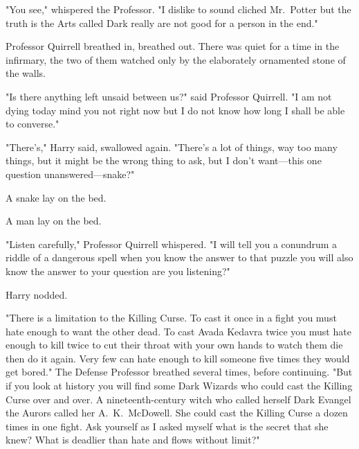 "You see," whispered the Professor. "I dislike to sound cliched{\el}
Mr.~Potter{\el} but the truth is{\el} the Arts called Dark{\el} really
are not good for a person{\el} in the end."

Professor Quirrell breathed in, breathed out. There was quiet for a time in the
infirmary, the two of them watched only by the elaborately ornamented stone of
the walls.

"Is there anything left{\el} unsaid between us?" said Professor Quirrell. "I
am not dying today{\el} mind you{\el} not right now{\el} but I do not
know how long{\el} I shall be able to converse."

"There's," Harry said, swallowed again. "There's a lot of things, way too many
things, but{\el} it might be the wrong thing to ask, but I don't want---this
one question unanswered---snake?"

A snake lay on the bed.


A man lay on the bed.

"Listen carefully," Professor Quirrell whispered. "I will tell you a
conundrum{\el} a riddle of a dangerous spell{\el} when you know the
answer to that puzzle{\el} you will also know{\el} the answer to your
question{\el} are you listening?"

Harry nodded.

"There is a limitation{\el} to the Killing Curse. To cast it once{\el} in
a fight{\el} you must hate enough{\el} to want the other dead. To cast
Avada{\el} Kedavra twice{\el} you must hate enough{\el} to kill
twice{\el} to cut their throat with your own hands{\el} to watch them
die{\el} then do it again. Very few{\el} can hate enough{\el} to kill
someone{\el} five times{\el} they would{\el} get bored." The Defense
Professor breathed several times, before continuing. "But if you look at
history{\el} you will find some Dark Wizards{\el} who could cast the
Killing Curse{\el} over and over. A nineteenth-century witch{\el} who
called herself Dark Evangel{\el} the Aurors called her A.~K.~McDowell. She
could cast the Killing Curse{\el} a dozen times{\el} in one fight. Ask
yourself{\el} as I asked myself{\el} what is the secret{\el} that she
knew? What is deadlier than hate{\el} and flows without limit?"

